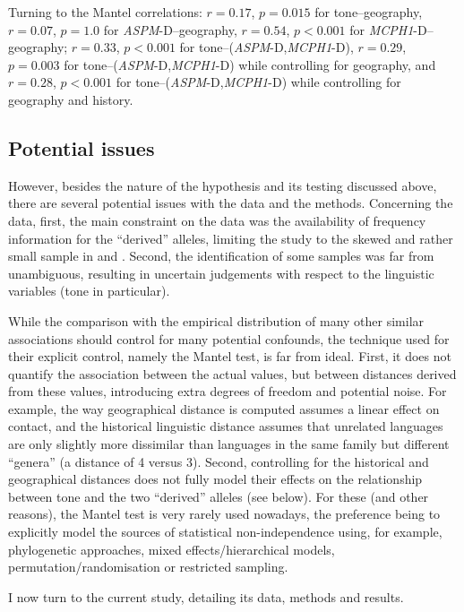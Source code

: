 \documentclass[twoside,onecolumn]{article}
\begin{document}
Turning to the Mantel correlations: $r = 0.17$, $p = 0.015$ for tone--geography, $r = 0.07$, $p = 1.0$ for \textit{ASPM}-D--geography, $r = 0.54$, $p < 0.001$ for \textit{MCPH1}-D--geography; $r = 0.33$, $p < 0.001$ for tone--(\textit{ASPM}-D,\textit{MCPH1}-D), $r = 0.29$, $p = 0.003$ for tone--(\textit{ASPM}-D,\textit{MCPH1}-D) while controlling for geography, and $r = 0.28$, $p < 0.001$ for tone--(\textit{ASPM}-D,\textit{MCPH1}-D) while controlling for geography and history.

\subsection{Potential issues}

However, besides the nature of the hypothesis and its testing discussed above, there are several potential issues with the data and the methods.
Concerning the data, first, the main constraint on the data was the availability of frequency information for the ``derived'' alleles, limiting the study to the skewed and rather small sample in \citet{evans_microcephalin_2005} and \citet{mekelbobrov_aspm_2005}.
Second, the identification of some samples was far from unambiguous, resulting in uncertain judgements with respect to the linguistic variables (tone in particular).

While the comparison with the empirical distribution of many other similar associations should control for many potential confounds, the technique used for their explicit control, namely the Mantel test, is far from ideal.
First, it does not quantify the association between the actual values, but between distances derived from these values, introducing extra degrees of freedom and potential noise.
For example, the way geographical distance is computed assumes a linear effect on contact, and the historical linguistic distance assumes that unrelated languages are only slightly more dissimilar than languages in the same family but different ``genera'' (a distance of 4 versus 3).
Second, controlling for the historical and geographical distances does not fully model their effects on the relationship between tone and the two ``derived'' alleles (see below).
For these (and other reasons), the Mantel test is very rarely used nowadays, the preference being to explicitly model the sources of statistical non-independence using, for example, phylogenetic approaches, mixed effects/hierarchical models, permutation/randomisation or restricted sampling.

I now turn to the current study, detailing its data, methods and results.
\end{document}
